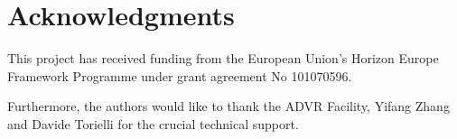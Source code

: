 \section*{Acknowledgments}
This project has received funding from the European Union's Horizon Europe Framework Programme under grant agreement No 101070596. 

Furthermore, the authors would like to thank the ADVR Facility, Yifang Zhang and Davide Torielli for the crucial technical support.
